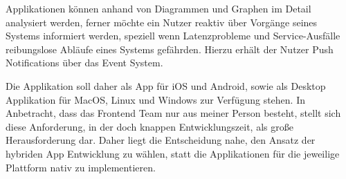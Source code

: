Applikationen können anhand von Diagrammen und Graphen im Detail analysiert werden,
ferner möchte ein Nutzer reaktiv über Vorgänge seines Systems informiert werden, speziell wenn Latenzprobleme und Service-Ausfälle reibungslose Abläufe eines Systems gefährden.
Hierzu erhält der Nutzer Push Notifications über das Event System.

Die Applikation soll daher als App für iOS und Android, sowie als Desktop Applikation für MacOS, Linux und Windows zur Verfügung stehen.
In Anbetracht, dass das Frontend Team nur aus meiner Person besteht, stellt sich diese Anforderung, in der doch knappen Entwicklungszeit, als große Herausforderung dar.
Daher liegt die Entscheidung nahe, den Ansatz der hybriden App Entwicklung zu wählen, statt die Applikationen für die jeweilige Plattform nativ zu implementieren.
